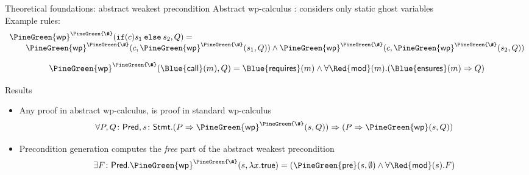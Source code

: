 \documentclass[final,nocolorBG,a4,marieke,nototal,ps, accumulate,slideColor]{prosper}
\begin{document}
\begin{slide}{Theoretical foundations: abstract weakest precondition}
Abstract wp-calculus : considers only static 
ghost variables\\
Example rules:
\[
\begin{array}{l}
\mathsf{\PineGreen{wp}}^{\PineGreen{\#}}(\mathtt{if
(}c\mathtt{)}s_1\mathtt{\:else\:}s_2,Q) =\\
\qquad
\mathsf{\PineGreen{wp}}^{\PineGreen{\#}}(c, \mathsf{\PineGreen{wp}}^{\PineGreen{\#}}(s_1, Q)) \wedge
\mathsf{\PineGreen{wp}}^{\PineGreen{\#}}(c,
\mathsf{\PineGreen{wp}}^{\PineGreen{\#}}(s_2, Q))
\end{array}
\]

\[
\mathsf{\PineGreen{wp}}^{\PineGreen{\#}}(\mathsf{\Blue{call}}(m), Q) =
  \mathsf{\Blue{requires}}(m) \wedge 
  \forall \mathsf{\Red{mod}}(m). (\mathsf{\Blue{ensures}}(m) \Rightarrow Q)
\]
\end{slide}

\begin{slide}{Results}
\begin{itemize}
\item Any proof in abstract wp-calculus, is proof in standard
wp-calculus
\[
\forall P, Q\colon\mathsf{Pred}, s\colon\mathsf{Stmt}. 
(P \Rightarrow \mathsf{\PineGreen{wp}}^{\PineGreen{\#}}(s, Q)) \Rightarrow
               (P \Rightarrow \mathsf{\PineGreen{wp}}(s, Q))
\]
\item Precondition generation computes the \emph{free} part of the
abstract weakest precondition
\[
\exists F\colon\mathsf{Pred}.  
             \mathsf{\PineGreen{wp}}^{\PineGreen{\#}}(s, \lambda x. \mathsf{true}) = 
             (\mathsf{\PineGreen{pre}}(s, \emptyset) \wedge \forall
              \mathsf{\Red{mod}}(s). F) 
\]
\end{itemize}
\end{slide}
\end{document}

